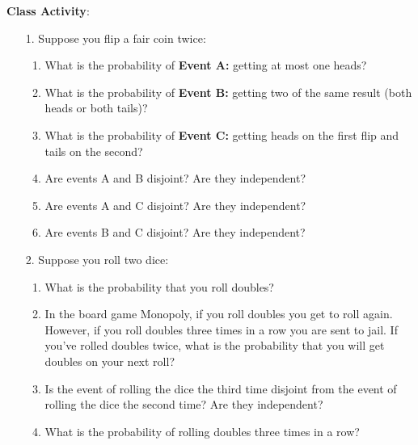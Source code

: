 \documentclass[oneside]{amsart}
\theoremstyle{definition}
\theoremstyle{definition}
\begin{document}
{\Large \textbf{ Class Activity}:}
\\
\begin{enumerate}
 \item[1.] Suppose you flip a fair coin twice:
    \begin{enumerate}
        \item What is the probability of \textbf{Event A:} getting at most one heads?
        \vfill
        \item What is the probability of \textbf{Event B:} getting two of the same result (both heads or both tails)?
        \vfill
        \item What is the probability of \textbf{Event C:} getting heads on the first flip and tails on the second?
        \vfill
        \item Are events A and B disjoint? Are they independent? 
        \vfill
        \item Are events A and C disjoint? Are they independent? 
        \vfill
        \item Are events B and C disjoint? Are they independent? 
        \vfill
\end{enumerate}

    \newpage

    \item[2.] Suppose you roll two dice: 
    \begin{enumerate}
        \item What is the probability that you roll doubles?

        \vfill

        \item In the board game Monopoly, if you roll doubles you get to roll again. However, if you roll doubles three times in a row you are sent to jail. If you've rolled doubles twice, what is the probability that you will get doubles on your next roll?
   
        \vfill

        \item Is the event of rolling the dice the third time disjoint from the event of rolling the dice the second time? Are they independent? 

        \vfill

        \item What is the probability of rolling doubles three times in a row? 

        \vfill

    \end{enumerate}
   


\end{enumerate}
\end{document}
